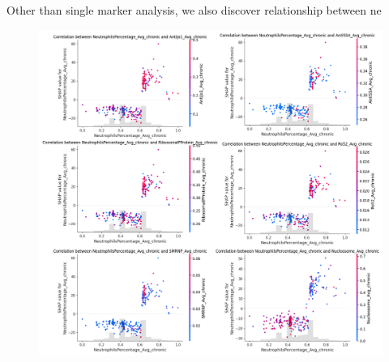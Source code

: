 \documentclass[final,1p,times,authoryear]{elsarticle}
\begin{document}
Other than single marker analysis, we also discover relationship between ne
\begin{figure}[t] 
    \centering
    \includegraphics[width=\textwidth]{figures/correlation.png} 
    \caption{}\label{correlation}
\end{figure}
\end{document}

